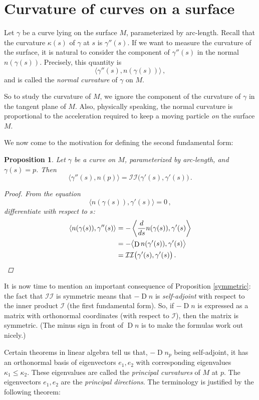 \documentclass[12pt]{article}
\providecommand{\defnterm}[1]{\emph{#1}}
\DeclareMathOperator{\D}{D}
\newcommand{\ctwo}{\mathcal{II}}
\newtheorem{prop}{Proposition}
\begin{document}
\section*{Curvature of curves on a surface}
Let $\gamma$ be a curve lying on the surface $M$, parameterized by arc-length.
Recall that the curvature $\kappa(s)$ of $\gamma$ at $s$
is $\gamma''(s)$.  If we want to measure the curvature of the surface, it is natural
to consider the component of $\gamma''(s)$ in the normal $n(\gamma(s))$.
Precisely, this quantity is
\[
\langle \gamma''(s), n(\gamma(s)) \rangle\,,
\]
and is called the \defnterm{normal curvature} of $\gamma$ on $M$.

So to study the curvature of $M$, we ignore the component of the curvature of $\gamma$ 
in the tangent plane of $M$.
Also, physically speaking, the normal curvature is proportional to the acceleration
required to keep a moving particle \emph{on} the surface $M$.

We now come to the motivation for defining the second fundamental form:
\begin{prop}\label{principal-curvature}
Let $\gamma$ be a curve on $M$, parameterized by arc-length,
and $\gamma(s) = p$.
Then
\[
\langle \gamma''(s), n(p) \rangle = \ctwo\bigl(\gamma'(s), \gamma'(s)\bigr)\,.
\]
\begin{proof}
From the equation
\[
\langle n(\gamma(s)), \gamma'(s) \rangle = 0\,,
\]
differentiate with respect to $s$:
\begin{align*}
\langle n(\gamma(s)), \gamma''(s) \rangle &= - \left\langle \frac{d}{ds} n(\gamma(s)), \gamma'(s) \right\rangle \\
&= -\bigl\langle \D n(\gamma'(s)), \gamma'(s) \bigr\rangle \\
&= \ctwo\bigl(\gamma'(s), \gamma'(s)\bigr)\,. \qedhere
\end{align*}
\end{proof}
\end{prop}

It is now time to mention an important consequence of Proposition \ref{symmetric}:
the fact that $\ctwo$ is symmetric means that 
$-\D n$ is \emph{self-adjoint} with respect to the inner product $\mathcal{I}$
(the first fundamental form).  So, if $-\D n$ is expressed
as a matrix with orthonormal coordinates (with respect to $\mathcal{I}$),
then the matrix is symmetric.  (The minus sign in front of $\D n$
is to make the formulas work out nicely.)

Certain theorems in linear algebra tell us
that, $-\D n_p$ being self-adjoint, it has an orthonormal basis of 
eigenvectors $e_1, e_2$ with corresponding eigenvalues $\kappa_1 \leq \kappa_2$.
These eigenvalues are called the \defnterm{principal curvatures}
of $M$ at $p$.  
The eigenvectors $e_1, e_2$ are the \defnterm{principal directions}.
The terminology is justified by the following theorem:
\end{document}
